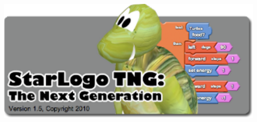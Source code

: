 \begin{frame}
\begin{itemize}
		\includegraphics[scale=0.4]{doc/Presentation/image/starlogo.pdf}
\end{itemize}
\end{frame}


